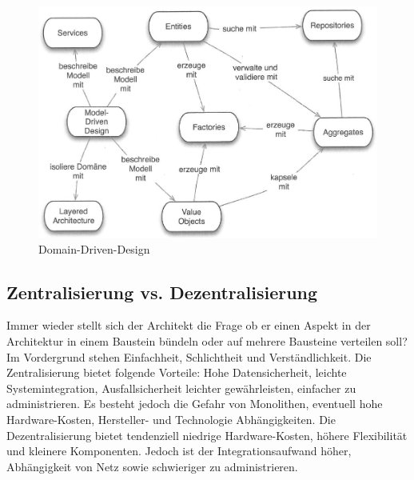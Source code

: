 \begin{figure}[h!]
\centering
\includegraphics[width=0.7\linewidth]{fig/domain-driven-design}
\caption{Domain-Driven-Design}
\label{fig:domain-driven-design}
\end{figure}

\subsection{Zentralisierung vs. Dezentralisierung}
Immer wieder stellt sich der Architekt die Frage ob er einen Aspekt in der Architektur in einem Baustein bündeln oder auf mehrere Bausteine verteilen soll? Im Vordergrund stehen Einfachheit, Schlichtheit und Verständlichkeit. Die Zentralisierung bietet folgende Vorteile: Hohe Datensicherheit, leichte Systemintegration, Ausfallsicherheit leichter gewährleisten, einfacher zu administrieren. Es besteht jedoch die Gefahr von Monolithen, eventuell hohe Hardware-Kosten, Hersteller- und Technologie Abhängigkeiten. Die Dezentralisierung bietet tendenziell niedrige Hardware-Kosten, höhere Flexibilität und kleinere Komponenten. Jedoch ist der Integrationsaufwand höher, Abhängigkeit von Netz sowie schwieriger zu administrieren.

